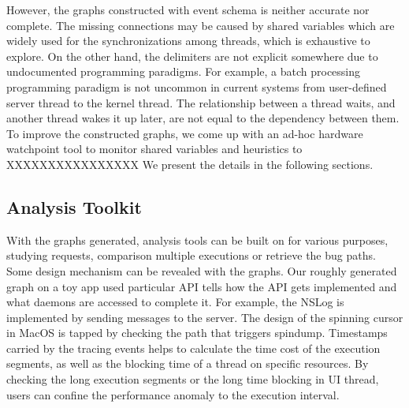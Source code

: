 However, the graphs constructed with event schema is neither accurate nor complete.
The missing connections may be caused by shared variables which are widely used for the synchronizations among threads, which is exhaustive to explore.
On the other hand, the delimiters are not explicit somewhere due to undocumented programming paradigms.
For example, a batch processing programming paradigm is not uncommon in current systems from user-defined server thread to the kernel thread.
The relationship between a thread waits, and another thread wakes it up later, are not equal to the dependency between them.
To improve the constructed graphs, we come up with an ad-hoc hardware watchpoint tool to monitor shared variables and heuristics to XXXXXXXXXXXXXXXX
We present the details in the following sections.

\subsection{Analysis Toolkit}
With the graphs generated, analysis tools can be built on for various purposes, studying requests, comparison multiple executions or retrieve the bug paths.
Some design mechanism can be revealed with the graphs.
Our roughly generated graph on a toy app used particular API tells how the API gets implemented and what daemons are accessed to complete it.
For example, the NSLog is implemented by sending messages to the server.
The design of the spinning cursor in MacOS is tapped by checking the path that triggers spindump.
Timestamps carried by the tracing events helps to calculate the time cost of the execution segments, as well as the blocking time of a thread on specific resources.
By checking the long execution segments or the long time blocking in UI thread, users can confine the performance anomaly to the execution interval.
